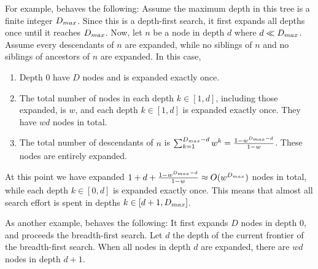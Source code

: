 
For example, \lifo behaves the following: Assume the maximum depth in this tree is a finite integer
$D_{\mit{max}}$. Since this is a depth-first search, it first expands all depths once until it reaches
$D_{\mit{max}}$.
% 
% 
Now, let $n$ be a node in depth $d$ where $d\ll D_{\mit{max}}$.  Assume every descendants of $n$ are expanded,
while no siblings of $n$ and no siblings of ancestors of $n$ are expanded.  In this case,
\begin{enumerate}
 \item Depth 0 have $D$ nodes and is expanded exactly once.
 \item The total number of nodes in each depth $k\in [1,d]$, including those expanded, is $w$, and each depth $k\in [1,d]$ is expanded exactly once. They have $wd$ nodes in total.
 \item The total number of descendants of $n$ is $\sum_{k=1}^{D_{\mit{max}}-d} w^k = \frac{1-w^{D_{\mit{max}}-d}}{1-w}$. These nodes are entirely expanded.
\end{enumerate}
At this point we have expanded $1+d+\frac{1-w^{D_{\mit{max}}-d}}{1-w} \approx O(w^{D_{\mit{max}}})$ nodes in total,
while each depth $k\in [0,d]$ is expanded exactly once.
This means that almost all search effort is spent in depths $k\in [d+1,D_{\mit{max}}]$.

As another example, \fifo behaves the following: It first expands $D$ nodes in depth 0, and proceeds the
breadth-first search. Let $d$ the depth of the current frontier of the breadth-first search. When all nodes in
depth $d$ are expanded, there are $wd$ nodes in depth $d+1$.
